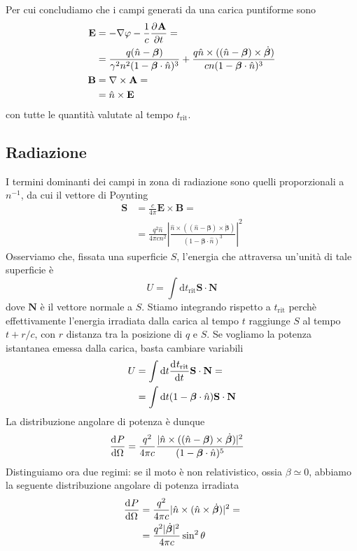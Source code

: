 \documentclass[a4paper,11pt]{article}
\renewcommand{\d}{\mathrm{d}}
\renewcommand{\vec}[1]{\mathbf{#1}}
\renewcommand{\t}{t_{\mathrm{rit}}}
\begin{document}
Per cui concludiamo che i campi generati da una carica puntiforme sono
\begin{align*}
	\vec{E}&=-\nabla\varphi-\frac{1}{c}\pder{\vec{A}}{t}=\\&=\frac{q(\hat{n}-\bm{\beta})}{\gamma^2n^2(1-\bm{\beta}\cdot\hat{n})^3}+\frac{q\hat{n}\times((\hat{n}-\bm{\beta})\times\dot{\bm{\beta}})}{cn(1-\bm{\beta}\cdot\hat{n})^3}\\
	\vec{B}&=\nabla\times\vec{A}=\\&=\hat{n}\times\vec{E}
\end{align*}
con tutte le quantità valutate al tempo $\t$.
\subsection{Radiazione}
I termini dominanti dei campi in zona di radiazione sono quelli proporzionali a $n^{-1}$, da cui il vettore di Poynting
\begin{align*}\vec{S}&=\frac{c}{4\pi}\vec{E}\times\vec{B}=\\&=\frac{q^2\hat{n}}{4\pi cn^2}\left|\frac{\hat n\times((\hat{n}-\bm{\beta})\times\dot{\bm{\beta}})}{(1-\bm{\beta}\cdot\hat{n})^3}\right|^2
\end{align*}
Osserviamo che, fissata una superficie $S$, l'energia che attraversa un'unità di tale superficie è
\[U=\int \d\t \vec{S}\cdot\vec{N}\]
dove $\vec{N}$ è il vettore normale a $S$. Stiamo integrando rispetto a $\t$ perchè effettivamente l'energia irradiata dalla carica al tempo $t$ raggiunge $S$ al tempo $t+r/c$, con $r$ distanza tra la posizione di $q$ e $S$. Se vogliamo la potenza istantanea emessa dalla carica, basta cambiare variabili
\begin{align*}U&=\int \d t\der{\t}{t}\vec{S}\cdot\vec{N}=\\&=\int \d t(1-\bm{\beta}\cdot\hat{n})\vec{S}\cdot\vec{N}\end{align*}
La distribuzione angolare di potenza è dunque
\begin{align*}
	\der{P}{\Omega}&=\frac{q^2}{4\pi c}\frac{|\hat n\times((\hat{n}-\bm{\beta})\times\dot{\bm{\beta}})|^2}{(1-\bm{\beta}\cdot\hat{n})^5}
\end{align*}
Distinguiamo ora due regimi: se il moto è non relativistico, ossia $\beta\simeq0$, abbiamo la seguente distribuzione angolare di potenza irradiata
\begin{align*}
\der{P}{\Omega}&=\frac{q^2}{4\pi c}|\hat{n}\times(\hat{n}\times\dot{\bm{\beta}})|^2=\\&=\frac{q^2|\dot{\bm{\beta}}|^2}{4\pi c}\sin^2\theta
\end{align*}
\end{document}
